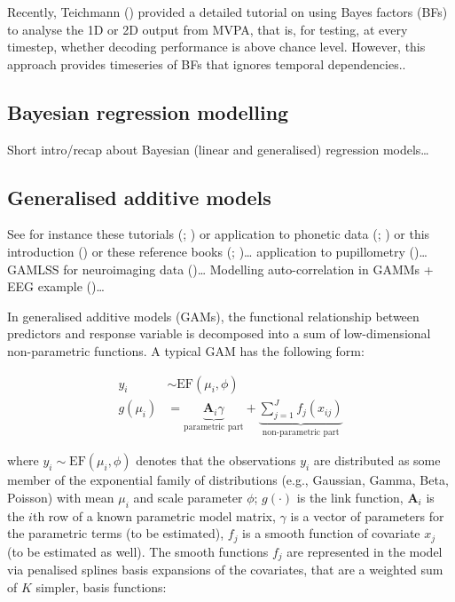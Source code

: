 \documentclass[
  doc,
  floatsintext,
  longtable,
  a4paper,
  nolmodern,
  notxfonts,
  notimes,
  colorlinks=true,linkcolor=blue,citecolor=blue,urlcolor=blue]{apa7}
\begin{document}
Recently, Teichmann () provided a
detailed tutorial on using Bayes factors (BFs) to analyse the 1D or 2D
output from MVPA, that is, for testing, at every timestep, whether
decoding performance is above chance level. However, this approach
provides timeseries of BFs that ignores temporal dependencies..

\subsection{Bayesian regression
modelling}\label{bayesian-regression-modelling}

Short intro/recap about Bayesian (linear and generalised) regression
models\ldots{}

\subsection{Generalised additive
models}\label{generalised-additive-models}

See for instance these tutorials
(;
) or application to
phonetic data (;
) or this introduction
() or these reference
books (;
)\ldots{} application to
pupillometry ()\ldots{}
GAMLSS for neuroimaging data ()\ldots{} Modelling auto-correlation in GAMMs + EEG example
()\ldots{}

In generalised additive models (GAMs), the functional relationship
between predictors and response variable is decomposed into a sum of
low-dimensional non-parametric functions. A typical GAM has the
following form:

\[
\begin{aligned} 
y_{i} &\sim \mathrm{EF}\left(\mu_{i}, \phi\right)\\
g\left(\mu_i\right) &= \underbrace{\mathbf{A}_{i} \gamma}_{\text{parametric part}} + \underbrace{\sum_{j=1}^{J} f_{j}\left(x_{ij}\right)}_{\text{non-parametric part}}
\end{aligned}
\]

where \(y_{i} \sim \mathrm{EF}\left(\mu_{i}, \phi\right)\) denotes that
the observations \(y_{i}\) are distributed as some member of the
exponential family of distributions (e.g., Gaussian, Gamma, Beta,
Poisson) with mean \(\mu_{i}\) and scale parameter \(\phi\);
\(g(\cdot)\) is the link function, \(\mathbf{A}_{i}\) is the \(i\)th row
of a known parametric model matrix, \(\gamma\) is a vector of parameters
for the parametric terms (to be estimated), \(f_{j}\) is a smooth
function of covariate \(x_{j}\) (to be estimated as well). The smooth
functions \(f_{j}\) are represented in the model via penalised splines
basis expansions of the covariates, that are a weighted sum of \(K\)
simpler, basis functions:
\end{document}
